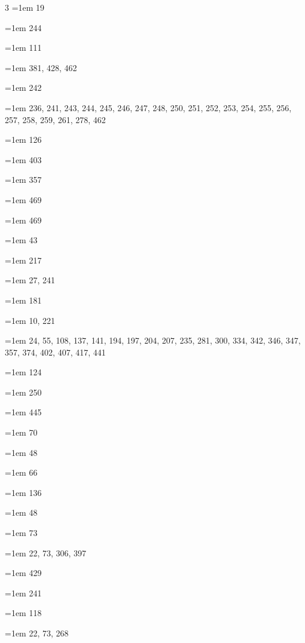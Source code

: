 \begin{multicols}{3}
\hangindent=1em  19\par
\hangindent=1em  244\par
\hangindent=1em  111\par
\hangindent=1em  381, 428, 462\par
\hangindent=1em  242\par
\hangindent=1em  236, 241, 243, 244, 245, 246, 247, 248, 250, 251, 252, 253, 254, 255, 256, 257, 258, 259, 261, 278, 462\par
\hangindent=1em  126\par
\hangindent=1em  403\par
\hangindent=1em  357\par
\hangindent=1em  469\par
\hangindent=1em  469\par
\hangindent=1em  43\par
\hangindent=1em  217\par
\hangindent=1em  27, 241\par
\hangindent=1em  181\par
\hangindent=1em  10, 221\par
\hangindent=1em  24, 55, 108, 137, 141, 194, 197, 204, 207, 235, 281, 300, 334, 342, 346, 347, 357, 374, 402, 407, 417, 441\par
\hangindent=1em  124\par
\hangindent=1em  250\par
\hangindent=1em  445\par
\hangindent=1em  70\par
\hangindent=1em  48\par
\hangindent=1em  66\par
\hangindent=1em  136\par
\hangindent=1em  48\par
\hangindent=1em  73\par
\hangindent=1em  22, 73, 306, 397\par
\hangindent=1em  429\par
\hangindent=1em  241\par
\hangindent=1em  118\par
\hangindent=1em  22, 73, 268\par

\end{multicols}
